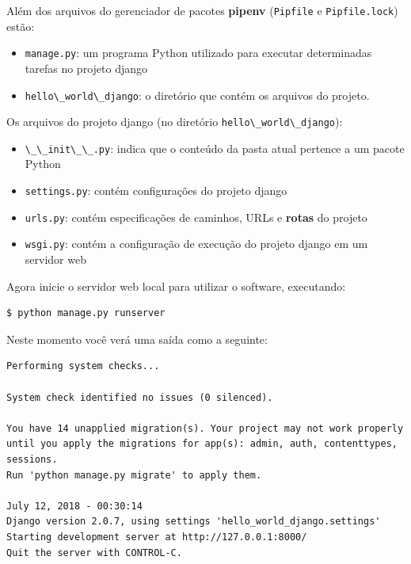 \documentclass[brazil,a4paper,oneside,openright,parskip=full]{book}
\newcommand{\passthrough}[1]{#1}
\providecommand{\tightlist}{%
  \setlength{\itemsep}{0pt}\setlength{\parskip}{0pt}}
\begin{document}

Além dos arquivos do gerenciador de pacotes \textbf{pipenv}
(\passthrough{\lstinline!Pipfile!} e
\passthrough{\lstinline!Pipfile.lock!}) estão:

\begin{itemize}
\tightlist
\item
  \passthrough{\lstinline!manage.py!}: um programa Python utilizado para
  executar determinadas tarefas no projeto django
\item
  \passthrough{\lstinline!hello\_world\_django!}: o diretório que contém
  os arquivos do projeto.
\end{itemize}

Os arquivos do projeto django (no diretório
\passthrough{\lstinline!hello\_world\_django!}):

\begin{itemize}
\tightlist
\item
  \passthrough{\lstinline!\_\_init\_\_.py!}: indica que o conteúdo da
  pasta atual pertence a um pacote Python
\item
  \passthrough{\lstinline!settings.py!}: contém configurações do projeto
  django
\item
  \passthrough{\lstinline!urls.py!}: contém especificações de caminhos,
  URLs e \textbf{rotas} do projeto
\item
  \passthrough{\lstinline!wsgi.py!}: contém a configuração de execução
  do projeto django em um servidor web
\end{itemize}

Agora inicie o servidor web local para utilizar o software, executando:

\begin{lstlisting}[language=sh, style=nonumber]
$ python manage.py runserver
\end{lstlisting}

Neste momento você verá uma saída como a seguinte:

\begin{lstlisting}[style=nonumber]
Performing system checks...

System check identified no issues (0 silenced).

You have 14 unapplied migration(s). Your project may not work properly until you apply the migrations for app(s): admin, auth, contenttypes, sessions.
Run 'python manage.py migrate' to apply them.

July 12, 2018 - 00:30:14
Django version 2.0.7, using settings 'hello_world_django.settings'
Starting development server at http://127.0.0.1:8000/
Quit the server with CONTROL-C.
\end{lstlisting}
\end{document}
